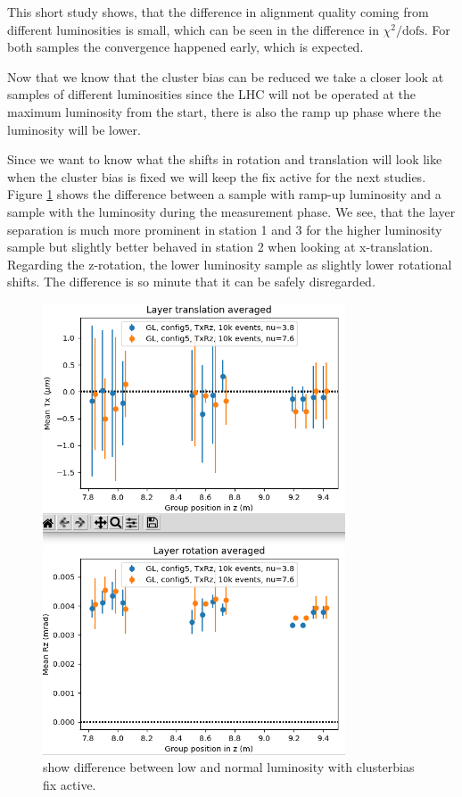 This short study shows, that the difference in alignment quality coming from different luminosities is small, which can be seen in the difference in $\chi^2 / \text{dofs}$. For both samples the convergence happened early, which is expected.

Now that we know that the cluster bias can be reduced we take a closer look at samples of different luminosities since the LHC will not be operated at the maximum luminosity from the start, there is also the ramp up phase where the luminosity will be lower.

Since we want to know what the shifts in rotation and translation will look like when the cluster bias is fixed we will keep the fix active for the next studies.
Figure \ref{fig:lumi_low_normal_hack_on} shows the difference between a sample with ramp-up luminosity and a sample with the luminosity during the measurement phase.
We see, that the layer separation is much more prominent in station 1 and 3 for the higher luminosity sample but slightly better behaved in station 2 when looking at x-translation.
Regarding the z-rotation, the lower luminosity sample as slightly lower rotational shifts.
The difference is so minute that it can be safely disregarded.

\begin{figure}
  \centering
  \includegraphics[width=0.8\textwidth]{plots/jan_24_2022/low_normal_with_hack.png}
  \caption{show difference between low and normal luminosity with clusterbias fix active.}
  \label{fig:lumi_low_normal_hack_on}
\end{figure}

